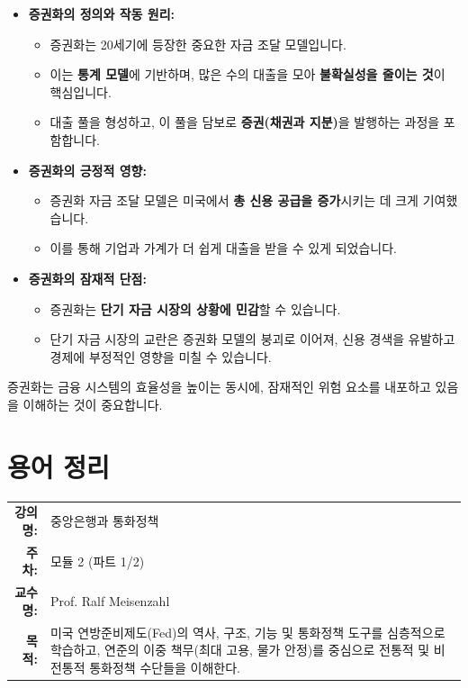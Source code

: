\documentclass[11pt,a4paper]{book}
\makeatletter
\theoremstyle{definition}
\newcommand{\metainfo}[4]{
\begin{tcolorbox}[
    colback=lightpurple,
    colframe=darkpurple,
    boxrule=1pt,
    arc=2mm,
    left=10pt,
    right=10pt,
    top=8pt,
    bottom=8pt
]
\begin{tabular}{@{}rl@{}}
\textbf{강의명:} & #1 \\[0.3em]
\textbf{주차:} & #2 \\[0.3em]
\textbf{교수명:} & #3 \\[0.3em]
\textbf{목적:} & \begin{minipage}[t]{0.75\textwidth}#4\end{minipage}
\end{tabular}
\end{tcolorbox}
}
\makeatother
\begin{document}
\begin{tcolorbox}[
    colback=lightgreen,
    colframe=darkgreen,
    title=\textbf{학습 내용 요약}
]
  \begin{itemize}
    \item \textbf{증권화의 정의와 작동 원리:}
      \begin{itemize}
        \item 증권화는 20세기에 등장한 중요한 자금 조달 모델입니다.
        \item 이는 \textbf{통계 모델}에 기반하며, 많은 수의 대출을 모아 \textbf{불확실성을 줄이는 것}이 핵심입니다.
        \item 대출 풀을 형성하고, 이 풀을 담보로 \textbf{증권(채권과 지분)}을 발행하는 과정을 포함합니다.
      \end{itemize}
    \item \textbf{증권화의 긍정적 영향:}
      \begin{itemize}
        \item 증권화 자금 조달 모델은 미국에서 \textbf{총 신용 공급을 증가}시키는 데 크게 기여했습니다.
        \item 이를 통해 기업과 가계가 더 쉽게 대출을 받을 수 있게 되었습니다.
      \end{itemize}
    \item \textbf{증권화의 잠재적 단점:}
      \begin{itemize}
        \item 증권화는 \textbf{단기 자금 시장의 상황에 민감}할 수 있습니다.
        \item 단기 자금 시장의 교란은 증권화 모델의 붕괴로 이어져, 신용 경색을 유발하고 경제에 부정적인 영향을 미칠 수 있습니다.
      \end{itemize}
  \end{itemize}
  증권화는 금융 시스템의 효율성을 높이는 동시에, 잠재적인 위험 요소를 내포하고 있음을 이해하는 것이 중요합니다.
\end{tcolorbox}


\chapter{용어 정리}
\label{ch:module6}

\metainfo{중앙은행과 통화정책}{모듈 2 (파트 1/2)}{Prof. Ralf Meisenzahl}{미국 연방준비제도(Fed)의 역사, 구조, 기능 및 통화정책 도구를 심층적으로 학습하고, 연준의 이중 책무(최대 고용, 물가 안정)를 중심으로 전통적 및 비전통적 통화정책 수단들을 이해한다.}
\end{document}
